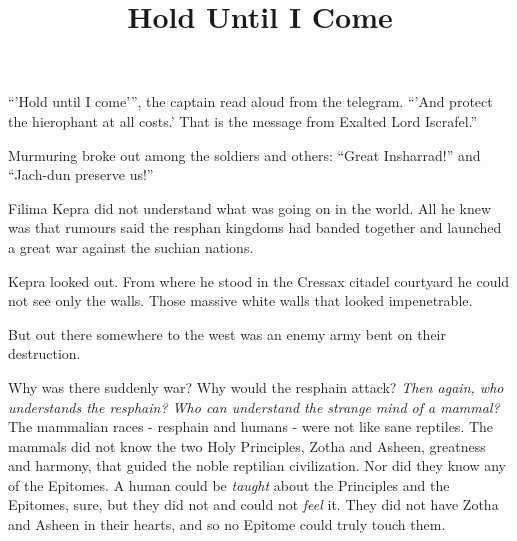 \documentclass
  [a4paper,
   12pt,
   oneside
  ]%
  {article}
\title{Hold Until I Come}
\begin{document}
    \maketitle














% 



``'Hold until I come'{}'', the captain read aloud from the telegram. ``'And protect the hierophant at all costs.' That is the message from Exalted Lord Iscrafel.'' 

Murmuring broke out among the soldiers and others: ``Great Insharrad!'' and ``Jach-dun preserve us!'' 

Filima Kepra did not understand what was going on in the world. All he knew was that rumours said the resphan kingdoms had banded together and launched a great war against the suchian nations. 

Kepra looked out. From where he stood in the Cressax citadel courtyard he could not see only the walls. Those massive white walls that looked impenetrable. 

But out there somewhere to the west was an enemy army bent on their destruction.

Why was there suddenly war? Why would the resphain attack? \emph{Then again, who understands the resphain? Who can understand the strange mind of a mammal?} The mammalian races - resphain and humans - were not like sane reptiles. The mammals did not know the two Holy Principles, Zotha and Asheen, greatness and harmony, that guided the noble reptilian civilization. Nor did they know any of the Epitomes. A human could be \emph{taught} about the Principles and the Epitomes, sure, but they did not and could not \emph{feel} it. They did not have Zotha and Asheen in their hearts, and so no Epitome could truly touch them. 
\end{document}
